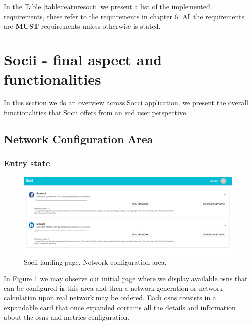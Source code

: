 In the Table \ref{table:featuresocii} we present a list of the implemented requirements, these refer to the requirements in chapter 6. All the requirements are \textbf{MUST} requirements unless otherwise is stated.


\section{Socii - final aspect and functionalities}
In this section we do an overview across Socci application, we present the overall functionalities that Socii offers
from an end user perspective.

\subsection{Network Configuration Area}

\subsubsection*{Entry state}

\begin{figure}[h!]
\begin{center}
  \hspace*{-0.8in}
  \includegraphics[width=1.2\textwidth]{img/socii/socii_1.png}
\end{center}
\caption{\label{img:socii_1} Socii landing page. Network configuration area.}
\end{figure}

In Figure \ref{img:socii_1} we may observe our initial page where we display available \glspl{osn} that can be configured in this area and then a network generation or network calculation upon real network may be ordered. Each \glspl{osn} consists in a expandable card that once expanded contains all the details and information about the \glspl{osn} and metrics configuration.

